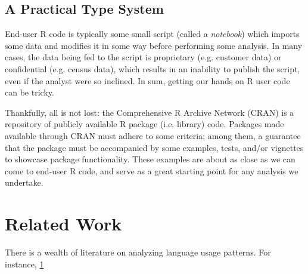 \documentclass[sigplan,10pt,review,anonymous]{acmart}\settopmatter{printfolios=true,printccs=false,printacmref=false}
\begin{document}
%
%
\subsection{A Practical Type System}
\label{sec:practicalTS}

End-user R code is typically some small script (called a {\it notebook}) which imports some data and modifies it in some way before performing some analysis.
In many cases, the data being fed to the script is proprietary (e.g. customer data) or confidential (e.g. census data), which results in an inability to publish the script, even if the analyst were so inclined.
In sum, getting our hands on R user code can be tricky.

Thankfully, all is not lost: the Comprehensive R Archive Network (CRAN) is a repository of publicly available R package (i.e. library) code.
Packages made available through CRAN must adhere to some criteria; among them, a guarantee that the package must be accompanied by some examples, tests, and/or vignettes to showcase package functionality.
These examples are about as close as we can come to end-user R code, and serve as a great starting point for any analysis we undertake.

%
%
%
%
\section{Related Work}

There is a wealth of literature on analyzing language usage patterns.
For instance, \ref{}

%
%
%


\end{document}
